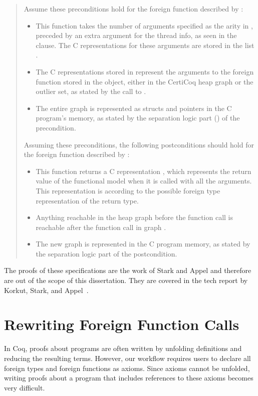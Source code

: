 \begin{quote}
Assume these preconditions hold for the foreign function described by :
\begin{itemize}
\item This function takes the number of arguments specified as the arity in , preceded by an extra argument for the \gls{thread info}, as seen in the  clause. The C representations for these arguments are stored in the list .
\item The C representations stored in  represent the arguments to the \gls{foreign function} stored in the \args{} object, either in the \gls{CertiCoq heap} graph  or the outlier set, as stated by the call to \ingraphs{}.
\item The entire graph  is represented as structs and pointers in the C program's memory, as stated by the separation logic part () of the precondition.
\end{itemize}
Assuming these preconditions, the following postconditions should hold for the foreign function described by :
\begin{itemize}
  \item This function returns a C representation , which represents the return value of the \gls{functional model} when it is called with all the arguments. This representation is according to the possible \gls{foreign type} representation of the return type.
\item Anything reachable in the heap graph  before the function call is reachable after the function call in graph .
\item The new graph  is represented in the C program memory, as stated by the separation logic part of the postcondition.
\end{itemize}
\end{quote}

The proofs of these specifications are the work of Stark and Appel and therefore are out of the scope of this dissertation. They are covered in the tech report by Korkut, Stark, and Appel~\cite{korkutStarkAppel}.

\section{Rewriting Foreign Function Calls}
\label{modelspec}

In Coq, proofs about programs are often written by unfolding definitions and reducing the resulting terms. However, our \FFI{} workflow requires users to declare all \gls{foreign type}s and \gls{foreign function}s as axioms. Since axioms cannot be unfolded, writing proofs about a program that includes references to these axioms becomes very difficult. 

